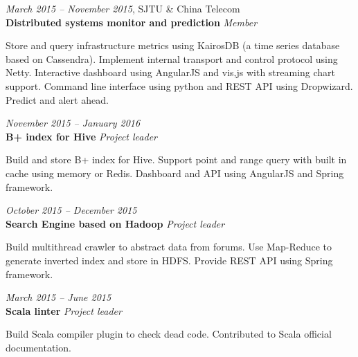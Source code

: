 \documentclass[fontsize=10pt]{tccv}
\begin{document}
\begin{eventlist}

\textit{March 2015 -- November 2015}, SJTU \& China Telecom \\
\textbf{Distributed systems monitor and prediction} \textit{Member}\smallskip

Store and query infrastructure metrics using KairosDB (a time series database based on Cassendra).
Implement internal transport and control protocol using Netty.
Interactive dashboard using AngularJS and vis,js with streaming chart support.
Command line interface using python and REST API using Dropwizard.
Predict and alert ahead.

\medskip

\textit{November 2015 -- January 2016} \\
\textbf{B+ index for Hive} \textit{Project leader}\smallskip

Build and store B+ index for Hive.
Support point and range query with built in cache using memory or Redis.
Dashboard and API using AngularJS and Spring framework.

\medskip

\textit{October 2015 -- December 2015} \\
\textbf{Search Engine based on Hadoop} \textit{Project leader}\smallskip

Build multithread crawler to abstract data from forums.
Use Map-Reduce to generate inverted index and store in HDFS.
Provide REST API using Spring framework.

\medskip

\textit{March 2015 -- June 2015} \\
\textbf{Scala linter} \textit{Project leader}\smallskip

Build Scala compiler plugin to check dead code.
Contributed to Scala official documentation.

\medskip


%


\end{eventlist}
\end{document}
